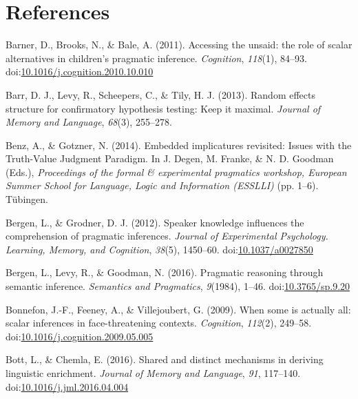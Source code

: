 \documentclass[man]{apa6}
\theoremstyle{definition}
\theoremstyle{definition}
\theoremstyle{definition}
\theoremstyle{remark}
\begin{document}
\section{References}\label{references}

\setlength{\parindent}{-0.5in} \setlength{\leftskip}{0.5in}

\hypertarget{refs}{}
\hypertarget{ref-Barner2011}{}
Barner, D., Brooks, N., \& Bale, A. (2011). Accessing the unsaid: the
role of scalar alternatives in children's pragmatic inference.
\emph{Cognition}, \emph{118}(1), 84--93.
doi:\href{https://doi.org/10.1016/j.cognition.2010.10.010}{10.1016/j.cognition.2010.10.010}

\hypertarget{ref-barr2013random}{}
Barr, D. J., Levy, R., Scheepers, C., \& Tily, H. J. (2013). Random
effects structure for confirmatory hypothesis testing: Keep it maximal.
\emph{Journal of Memory and Language}, \emph{68}(3), 255--278.

\hypertarget{ref-BenzGotzner2014}{}
Benz, A., \& Gotzner, N. (2014). Embedded implicatures revisited: Issues
with the Truth-Value Judgment Paradigm. In J. Degen, M. Franke, \& N. D.
Goodman (Eds.), \emph{Proceedings of the formal \& experimental
pragmatics workshop, European Summer School for Language, Logic and
Information (ESSLLI)} (pp. 1--6). Tübingen.

\hypertarget{ref-Bergen2012}{}
Bergen, L., \& Grodner, D. J. (2012). Speaker knowledge influences the
comprehension of pragmatic inferences. \emph{Journal of Experimental
Psychology. Learning, Memory, and Cognition}, \emph{38}(5), 1450--60.
doi:\href{https://doi.org/10.1037/a0027850}{10.1037/a0027850}

\hypertarget{ref-Bergen2016}{}
Bergen, L., Levy, R., \& Goodman, N. (2016). Pragmatic reasoning through
semantic inference. \emph{Semantics and Pragmatics}, \emph{9}(1984),
1--46. doi:\href{https://doi.org/10.3765/sp.9.20}{10.3765/sp.9.20}

\hypertarget{ref-Bonnefon2009}{}
Bonnefon, J.-F., Feeney, A., \& Villejoubert, G. (2009). When some is
actually all: scalar inferences in face-threatening contexts.
\emph{Cognition}, \emph{112}(2), 249--58.
doi:\href{https://doi.org/10.1016/j.cognition.2009.05.005}{10.1016/j.cognition.2009.05.005}

\hypertarget{ref-Bott2016}{}
Bott, L., \& Chemla, E. (2016). Shared and distinct mechanisms in
deriving linguistic enrichment. \emph{Journal of Memory and Language},
\emph{91}, 117--140.
doi:\href{https://doi.org/10.1016/j.jml.2016.04.004}{10.1016/j.jml.2016.04.004}
\end{document}
